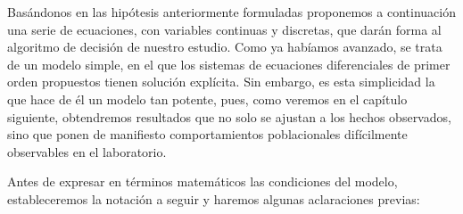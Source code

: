 Basándonos en las hipótesis anteriormente formuladas proponemos a continuación una serie de ecuaciones, con variables continuas y discretas, que darán forma al algoritmo de decisión de nuestro estudio. Como ya habíamos avanzado, se trata de un modelo simple, en el que los sistemas de ecuaciones diferenciales de primer orden propuestos tienen solución explícita. Sin embargo, es esta simplicidad la que hace de él un modelo tan potente, pues, como veremos en el capítulo siguiente, obtendremos resultados que no solo se ajustan a los hechos observados, sino que ponen de manifiesto comportamientos poblacionales difícilmente observables en el laboratorio.

Antes de expresar en términos matemáticos las condiciones del modelo, estableceremos la notación a seguir y haremos algunas aclaraciones previas: 

